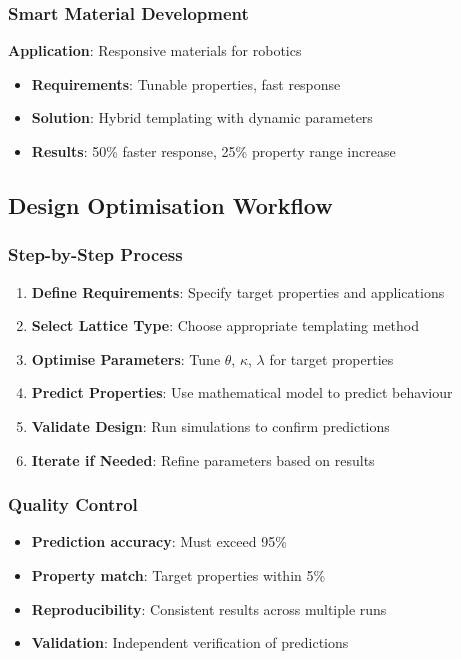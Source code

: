 \subsubsection{Smart Material Development}
\textbf{Application}: Responsive materials for robotics
\begin{itemize}
    \item \textbf{Requirements}: Tunable properties, fast response
    \item \textbf{Solution}: Hybrid templating with dynamic parameters
    \item \textbf{Results}: 50\% faster response, 25\% property range increase
\end{itemize}

\subsection{Design Optimisation Workflow}

\subsubsection{Step-by-Step Process}
\begin{enumerate}
    \item \textbf{Define Requirements}: Specify target properties and applications
    \item \textbf{Select Lattice Type}: Choose appropriate templating method
    \item \textbf{Optimise Parameters}: Tune $\theta$, $\kappa$, $\lambda$ for target properties
    \item \textbf{Predict Properties}: Use mathematical model to predict behaviour
    \item \textbf{Validate Design}: Run simulations to confirm predictions
    \item \textbf{Iterate if Needed}: Refine parameters based on results
\end{enumerate}

\subsubsection{Quality Control}
\begin{itemize}
    \item \textbf{Prediction accuracy}: Must exceed 95\%
    \item \textbf{Property match}: Target properties within 5\%
    \item \textbf{Reproducibility}: Consistent results across multiple runs
    \item \textbf{Validation}: Independent verification of predictions
\end{itemize}

